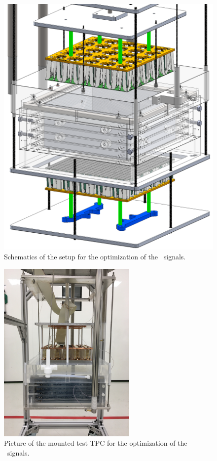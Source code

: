 \begin{figure}[!t]
\centering
\includegraphics[height=0.6\textheight]{./Figures/mini-proto.png}
\caption[Schematics of the setup for the optimization of the \STwo\ signals]{Schematics of the setup for the optimization of the \STwo\ signals.}
\label{fig:mini-proto}
\end{figure}

\begin{figure}[!t]
\centering
\includegraphics[angle=-90,width=0.6\textwidth]{./Figures/proto0_mockup.jpeg}
\caption[Picture of the mounted test TPC for the optimization of the \STwo\ signals.]{Picture of the mounted test TPC for the optimization of the \STwo\ signals.}
\label{fig:proto0_mockup}
\end{figure}

